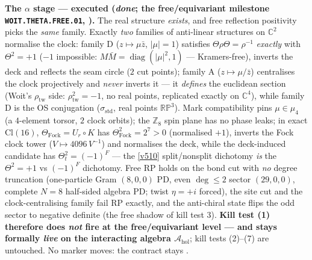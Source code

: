 \documentclass[11pt,a4paper]{article}
\newcommand{\Z}{\mathbb Z}
\begin{document}
\par\smallskip\noindent\textbf{The $\alpha$ stage --- executed (\emph{done}; the free/equivariant
milestone \texttt{WOIT.THETA.FREE.01}, ).} The real structure
\emph{exists}, and free reflection positivity picks the \emph{same} family. Exactly \emph{two}
families of anti-linear structures on $\mathbb C^2$ normalise the clock: family D
($z\mapsto\mu\bar z$, $|\mu|=1$) satisfies $\Theta\rho\Theta=\rho^{-1}$ \emph{exactly} with
$\Theta^2=+1$ ($-1$ impossible: $M\bar M=\operatorname{diag}(|\mu|^2,1)$ --- Kramers-free), inverts
the deck and reflects the seam circle ($2$ cut points); family A ($z\mapsto\mu/\bar z$) centralises
the clock projectively and \emph{never} inverts it --- it \emph{defines} the euclidean section
(Woit's $\rho_{\mathrm{tw}}$ side: $\rho_{\mathrm{tw}}^2=-1$, no real points, replicated exactly on
$\mathbb C^4$), while family D is the OS conjugation ($\sigma_{\mathrm{std}}$, real points
$\mathbb{RP}^3$). Mark compatibility pins $\mu\in\mu_4$ (a $4$-element torsor, $2$ clock orbits);
the $\Z_8$ spin plane has no phase leaks; in exact $\mathrm{Cl}(16)$,
$\Theta_{\mathrm{Fock}}=U_r\circ K$ has $\Theta_{\mathrm{Fock}}^2=2^7>0$ (normalised $+1$), inverts
the Fock clock tower ($V\mapsto 4096\,V^{-1}$) and normalises the deck, while the deck-induced
candidate has $\Theta_t^2=(-1)^F$ --- the \vref{v510} split/nonsplit dichotomy \emph{is} the
$\Theta^2=+1$ vs $(-1)^F$ dichotomy. Free RP holds on the bond cut with \emph{no} degree truncation
(one-particle Gram $(8,0,0)$ PD, even $\deg\le2$ sector $(29,0,0)$, complete $N=8$ half-sided
algebra PD; twist $\eta=+i$ forced), the site cut and the clock-centralising family fail RP
exactly, and the anti-chiral state flips the odd sector to negative definite (the free shadow of
kill test 3). \textbf{Kill test (1) therefore does \emph{not} fire at the free/equivariant level
--- and stays formally \emph{live} on the interacting algebra $\mathcal A_{\mathrm{hol}}$}; kill
tests (2)--(7) are untouched. No marker moves: the contract stays \mO.
\end{document}
